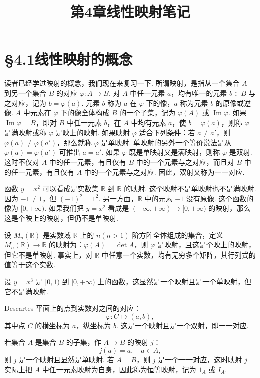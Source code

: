 \documentclass[UTF8,12pt,a4paper,fontset=fandol]{ctexart}
\title{第4章\quad 线性映射笔记}
\author{}
\date{}
\begin{document}
\maketitle

\section*{§4.1\quad 线性映射的概念}

读者已经学过映射的概念，我们现在来复习一下. 所谓映射，是指从一个集合 $A$ 到另一个集合 $B$ 的对应 $\varphi:A\to B$. 对 $A$ 中任一元素 $a$，均有唯一的元素 $b\in B$ 与之对应，记为 $b=\varphi(a)$. 元素 $b$ 称为 $a$ 在 $\varphi$ 下的像，$a$ 称为元素 $b$ 的原像或逆像. $A$ 中元素在 $\varphi$ 下的像全体构成 $B$ 的一个子集，记为 $\varphi(A)$ 或 $\operatorname{Im}\varphi$. 如果 $\operatorname{Im}\varphi=B$，即对 $B$ 中任一元素 $b$，在 $A$ 中均有元素 $a$，使 $b=\varphi(a)$，则称 $\varphi$ 是满映射或称 $\varphi$ 是映上的映射. 如果映射 $\varphi$ 适合下列条件：若 $a\neq a'$，则 $\varphi(a)\neq\varphi(a')$，那么就称 $\varphi$ 是单映射. 单映射的另外一个等价说法是从 $\varphi(a)=\varphi(a')$ 可推出 $a=a'$. 如果 $\varphi$ 既是单映射又是满映射，则称 $\varphi$ 是双射. 这时不仅对 $A$ 中的任一元素，有且仅有 $B$ 中的一个元素与之对应，而且对 $B$ 中的任一元素，有且仅有 $A$ 中的一个元素与之对应. 因此，双射又称为一一对应.

函数 $y=x^2$ 可以看成是实数集 $\mathbb{R}$ 到 $\mathbb{R}$ 的映射. 这个映射不是单映射也不是满映射. 因为 $-1\neq 1$，但 $(-1)^2=1^2$. 另一方面，$\mathbb{R}$ 中的元素 $-1$ 没有原像. 这个函数的像为 $[0,+\infty)$. 如果我们把 $y=x^2$ 看成是 $(-\infty,+\infty)\to[0,+\infty)$ 的映射，那么这是个映上的映射，但仍不是单映射.

设 $M_n(\mathbb{R})$ 是实数域 $\mathbb{R}$ 上的 $n(n>1)$ 阶方阵全体组成的集合，定义 $M_n(\mathbb{R})\to\mathbb{R}$ 的映射为：$\varphi(A)=\det A$，则 $\varphi$ 是映射，且这是个映上的映射，但它不是单映射. 事实上，对 $\mathbb{R}$ 中任意一个实数，均有无穷多个矩阵，其行列式的值等于这个实数.

设 $y=x^3$ 是 $[0,1)$ 到 $[0,+\infty)$ 上的函数，这显然是一个映射且是一个单映射，但它不是满映射.

Descartes 平面上的点到实数对之间的对应：
\[
\varphi:C\mapsto(a,b),
\]
其中点 $C$ 的横坐标为 $a$，纵坐标为 $b$. 这是一个映射且是一个双射，即一一对应.

若集合 $A$ 是集合 $B$ 的子集，作 $A\to B$ 的映射 $j$：
\[
j(a)=a,\quad a\in A,
\]
则 $j$ 是一个映射且显然是单映射. 若 $A=B$，则 $j$ 是一个一一对应，这时映射 $j$ 实际上把 $A$ 中任一元素映射为自身，因此称为恒等映射，记为 $1_A$ 或 $I_A$.
\end{document}
